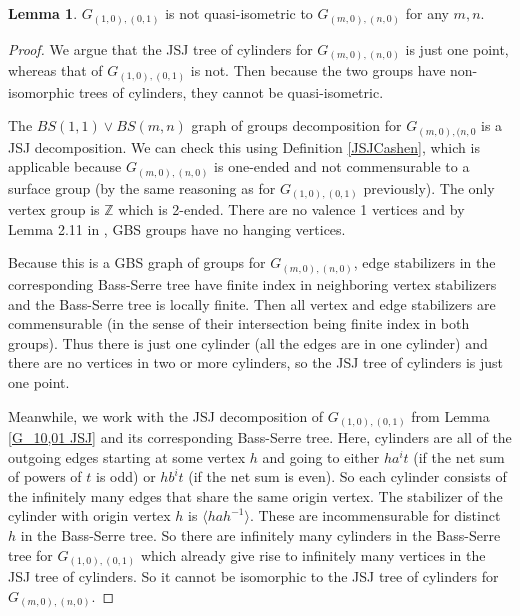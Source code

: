 \documentclass[10pt]{article}
\def\integers{{\mathbb{Z}}}
\theoremstyle{definition}
\newtheorem{lemma}{Lemma}
\begin{document}
\begin{lemma}
    $G_{(1,0),(0,1)}$ is not quasi-isometric to $G_{(m,0),(n,0)}$ for any $m,n$. 
\end{lemma}

\begin{proof}
We argue that the JSJ tree of cylinders for $G_{(m,0),(n,0)}$ is just one point, whereas that of $G_{(1,0),(0,1)}$ is not. Then because the two groups have non-isomorphic trees of cylinders, they cannot be quasi-isometric. 

The $BS(1,1)\vee BS(m,n)$ graph of groups decomposition for $G_{(m,0),(n,0}$ is a JSJ decomposition. We can check this using Definition \ref{JSJCashen}, which is applicable because $G_{(m,0),(n,0)}$ is one-ended and not commensurable to a surface group (by the same reasoning as for $G_{(1,0),(0,1)}$ previously). The only vertex group is $\integers$ which is 2-ended. There are no valence 1 vertices and by Lemma 2.11 in \cite{ForDeform}, GBS groups have no hanging vertices. 

Because this is a GBS graph of groups for $G_{(m,0),(n,0)}$, edge stabilizers in the corresponding Bass-Serre tree have finite index in neighboring vertex stabilizers and the Bass-Serre tree is locally finite. Then all vertex and edge stabilizers are commensurable (in the sense of their intersection being finite index in both groups). Thus there is just one cylinder (all the edges are in one cylinder) and there are no vertices in two or more cylinders, so the JSJ tree of cylinders is just one point. 

Meanwhile, we work with the JSJ decomposition of $G_{(1,0),(0,1)}$ from Lemma \ref{G_10,01 JSJ} and its corresponding Bass-Serre tree. Here, cylinders are all of the outgoing edges starting at some vertex $h$ and going to either $ha^i t$ (if the net sum of powers of $t$ is odd) or $hb^i t$ (if the net sum is even). So each cylinder consists of the infinitely many edges that share the same origin vertex. The stabilizer of the cylinder with origin vertex $h$ is $\langle h a h^{-1} \rangle$. These are incommensurable for distinct $h$ in the Bass-Serre tree. So there are infinitely many cylinders in the Bass-Serre tree for $G_{(1,0),(0,1)}$ which already give rise to infinitely many vertices in the JSJ tree of cylinders. So it cannot be isomorphic to the JSJ tree of cylinders for $G_{(m,0),(n,0)}$. 

\end{proof}
\end{document}

